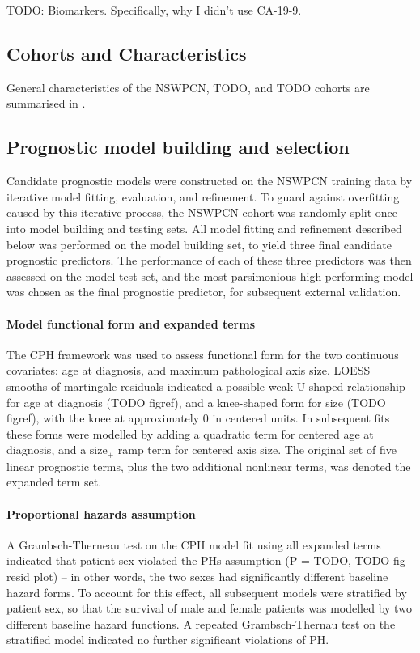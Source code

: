 \documentclass[dissertation.tex]{subfiles}
\begin{document}
TODO: Biomarkers.  Specifically, why I didn't use CA-19-9.

\subsection{Cohorts and Characteristics}
General characteristics of the \gls{NSWPCN}, TODO, and TODO cohorts are summarised in .

\subsection{Prognostic model building and selection}
Candidate prognostic models were constructed on the \gls{NSWPCN} training data by iterative model fitting, evaluation, and refinement.  To guard against overfitting caused by this iterative process, the \gls{NSWPCN} cohort was randomly split once into model building and testing sets.  All model fitting and refinement described below was performed on the model building set, to yield three final candidate prognostic predictors.  The performance of each of these three predictors was then assessed on the model test set, and the most parsimonious high-performing model was chosen as the final prognostic predictor, for subsequent external validation.

\paragraph{Model functional form and expanded terms}
The \gls{CPH} framework was used to assess functional form for the two continuous covariates: age at diagnosis, and maximum pathological axis size.  \gls{LOESS} smooths of martingale residuals indicated a possible weak U-shaped relationship for age at diagnosis (TODO figref), and a knee-shaped form for size (TODO figref), with the knee at approximately $0$ in centered units.  In subsequent fits these forms were modelled by adding a quadratic term for centered age at diagnosis, and a $\mbox{size}_+$ ramp term for centered axis size.  The original set of five linear prognostic terms, plus the two additional nonlinear terms, was denoted the expanded term set.

\paragraph{Proportional hazards assumption}
A Grambsch-Therneau test \cite{Grambsch1994} on the \gls{CPH} model fit using all expanded terms indicated that patient sex violated the \glspl{PH} assumption (P = TODO, TODO fig resid plot) -- in other words, the two sexes had significantly different baseline hazard forms.  To account for this effect, all subsequent models were stratified by patient sex, so that the survival of male and female patients was modelled by two different baseline hazard functions.  A repeated Grambsch-Thernau test on the stratified model indicated no further significant violations of \gls{PH}.
\end{document}
